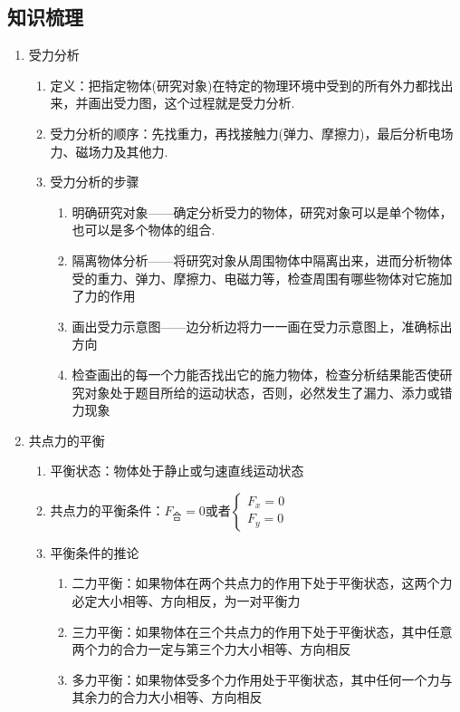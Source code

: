 \documentclass[cn,11pt]{elegantbook}
\begin{document}
      \subsection{知识梳理}
      \begin{enumerate}
         \item 受力分析
         \begin{enumerate}
            \item 定义：把指定物体(研究对象)在特定的物理环境中受到的所有外力都找出来，并画出受力图，这个过程就是受力分析.
            \item 受力分析的顺序：先找重力，再找接触力(弹力、摩擦力)，最后分析电场力、磁场力及其他力.
            \item 受力分析的步骤
            \begin{enumerate}
               \item 明确研究对象——确定分析受力的物体，研究对象可以是单个物体，也可以是多个物体的组合.
               \item 隔离物体分析——将研究对象从周围物体中隔离出来，进而分析物体受的重力、弹力、摩擦力、电磁力等，检查周围有哪些物体对它施加了力的作用
               \item 画出受力示意图——边分析边将力一一画在受力示意图上，准确标出方向
               \item 检查画出的每一个力能否找出它的施力物体，检查分析结果能否使研究对象处于题目所给的运动状态，否则，必然发生了漏力、添力或错力现象
               
            \end{enumerate}
            
         \end{enumerate}
         \item 共点力的平衡
         \begin{enumerate}
            \item 平衡状态：物体处于静止或匀速直线运动状态
            \item 共点力的平衡条件：$F_{合}=0$或者$\left\{\begin{array}{l}{F_{x}=0} \\ {F_{y}=0}\end{array}\right.$
            \item 平衡条件的推论
            \begin{enumerate}
               \item 二力平衡：如果物体在两个共点力的作用下处于平衡状态，这两个力必定大小相等、方向相反，为一对平衡力
               \item 三力平衡：如果物体在三个共点力的作用下处于平衡状态，其中任意两个力的合力一定与第三个力大小相等、方向相反
               \item 多力平衡：如果物体受多个力作用处于平衡状态，其中任何一个力与其余力的合力大小相等、方向相反
               

\end{enumerate}
\end{enumerate}
\end{enumerate}
\end{document}

